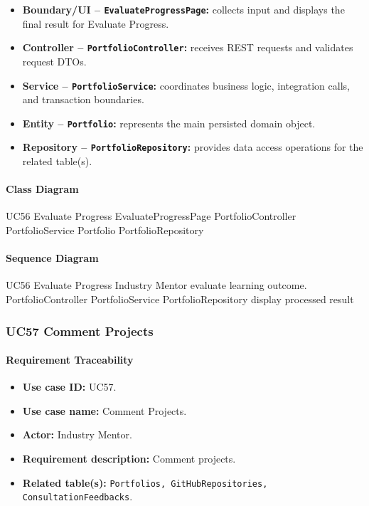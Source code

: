 \begin{itemize}
    \item \textbf{Boundary/UI -- \texttt{EvaluateProgressPage}:} collects input and displays the final result for Evaluate Progress.
    \item \textbf{Controller -- \texttt{PortfolioController}:} receives REST requests and validates request DTOs.
    \item \textbf{Service -- \texttt{PortfolioService}:} coordinates business logic, integration calls, and transaction boundaries.
    \item \textbf{Entity -- \texttt{Portfolio}:} represents the main persisted domain object.
    \item \textbf{Repository -- \texttt{PortfolioRepository}:} provides data access operations for the related table(s).
\end{itemize}

\paragraph{Class Diagram}

\ClassDiagram
{UC56 Evaluate Progress}
{EvaluateProgressPage}
{PortfolioController}
{PortfolioService}
{Portfolio}
{PortfolioRepository}

\paragraph{Sequence Diagram}

\SequenceDiagram
{UC56 Evaluate Progress}
{Industry Mentor}
{evaluate learning outcome.}
{PortfolioController}
{PortfolioService}
{PortfolioRepository}
{display processed result}

\subsubsection{UC57 Comment Projects}

\paragraph{Requirement Traceability}

\begin{itemize}
    \item \textbf{Use case ID:} UC57.
    \item \textbf{Use case name:} Comment Projects.
    \item \textbf{Actor:} Industry Mentor.
    \item \textbf{Requirement description:} Comment projects.
    \item \textbf{Related table(s):} \texttt{Portfolios, GitHubRepositories, ConsultationFeedbacks}.
\end{itemize}

